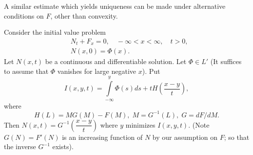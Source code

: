 \begin{remark*}
A similar estimate which yields uniqueness can be made under alternative conditions on $F$, other than convexity.
\end{remark*}

\begin{theorem*}
Consider the initial value problem
\begin{align*}
& N_t + F_x = 0, \quad -\infty < x < \infty, \quad t > 0, \\
& N(x, 0) = \Phi (x). 
\end{align*}
Let $N(x,t)$ be a continuous and differentiable solution. Let $\Phi \in L'$ (It suffices to assume that $\Phi$ vanishes for large negative $x$). Put
$$
I(x,y, t) = \int\limits^y_{-\infty} \Phi (s) ds + t H (\frac{x-y}{t}),
$$
where 
\begin{equation*}
H(L) = MG (M) - F(M) , \; M = G^{-1} (L), \; G = dF / dM . 
\tag{1.17}\label{eq1.17}
\end{equation*}
Then $N(x,t) = G^{-1} (\dfrac{x-y}{t})$ where $y$ minimizes $I(x,y,t)$.  (Note $G(N) = F'(N)$ is an increasing function of $N$ by our assumption on $F$; so that the inverse $G^{-1}$ exists).
\end{theorem*}

